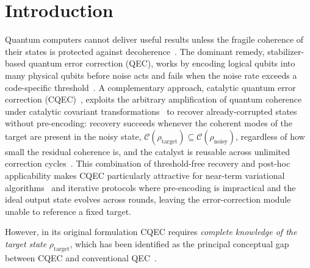 \documentclass[a4paper,onecolumn]{quantumarticle}
\newcommand{\CC}{\mathcal{C}}
\newcommand{\rhot}{\rho_\mathrm{target}}
\newcommand{\rhon}{\rho_\mathrm{noisy}}
\begin{document}
\maketitle 

 
\section{Introduction}
\label{sec:introduction}

Quantum computers cannot deliver useful results unless the fragile coherence of their states is protected against decoherence~\cite{NielsenChuang2010}.
The dominant remedy, stabilizer-based quantum error correction (QEC), works by encoding logical qubits into many physical qubits before noise acts and fails when the noise rate exceeds a code-specific threshold~\cite{Shor1995,Gottesman1997,Knill2005}.
A complementary approach, catalytic quantum error correction (CQEC)~\cite{Wakaura2026unified}, exploits the arbitrary amplification of quantum coherence under catalytic covariant transformations~\cite{Shiraishi2024} to recover already-corrupted states without pre-encoding: recovery succeeds whenever the coherent modes of the target are present in the noisy state, $\CC(\rhot) \subseteq \CC(\rhon)$, regardless of how small the residual coherence is, and the catalyst is reusable across unlimited correction cycles~\cite{Wakaura2026unified,Wakaura2026catalyst}.
This combination of threshold-free recovery and post-hoc applicability makes CQEC particularly attractive for near-term variational algorithms~\cite{Peruzzo2014,Cerezo2021} and iterative protocols where pre-encoding is impractical and the ideal output state evolves across rounds, leaving the error-correction module unable to reference a fixed target.

However, in its original formulation CQEC requires \emph{complete knowledge of the target state} $\rhot$, which has been identified as the principal conceptual gap between CQEC and conventional QEC~\cite{Wakaura2026unified}.
\end{document}
